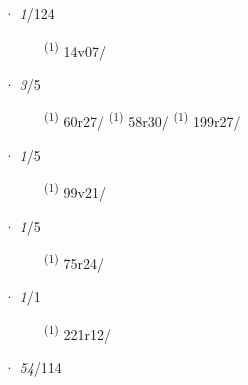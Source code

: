 \ENTRYEND
\noindent{} · \textit{1}/124 \LEMMALINE
\begin{description}
    \item[]  \textsuperscript{(1)} \mbox{14v07/}
\end{description}
\ENTRYEND
\noindent{} · \textit{3}/5 \LEMMALINE
\begin{description}
    \item[]  \textsuperscript{(1)} \mbox{60r27/} \CASEBREAK {} \textsuperscript{(1)} \mbox{58r30/} \textsuperscript{(1)} \mbox{199r27/}
\end{description}
\ENTRYEND
\noindent{} · \textit{1}/5 \LEMMALINE
\begin{description}
    \item[]  \textsuperscript{(1)} \mbox{99v21/}
\end{description}
\ENTRYEND
\noindent{} · \textit{1}/5 \LEMMALINE
\begin{description}
    \item[]  \textsuperscript{(1)} \mbox{75r24/}
\end{description}
\ENTRYEND
\noindent{} · \textit{1}/1 \LEMMALINE
\begin{description}
    \item[]  \textsuperscript{(1)} \mbox{221r12/}
\end{description}
\ENTRYEND
\noindent{} · \textit{54}/114 \LEMMALINE
